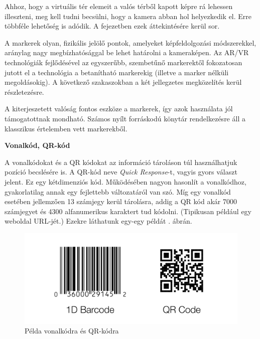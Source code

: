 
Ahhoz, hogy a virtuális tér elemeit a valós térből kapott képre rá lehessen illeszteni, meg kell tudni becsülni, hogy a kamera abban hol helyezkedik el.
Erre többféle lehetőség is adódik.
A fejezetben ezek áttekintésére kerül sor.


A markerek olyan, fizikális jelölő pontok, amelyeket képfeldolgozási módszerekkel, a\-rány\-lag nagy megbízhatósággal be lehet határolni a kameraképen.
Az AR/VR technológiák fejlődésével az egyszerűbb, szembetűnő markerektől fokozatosan jutott el a technológia a betanítható markerekig (illetve a marker nélküli megoldásokig).
A következő szakaszokban a két jellegzetes megközelítés kerül részletezésre.


A kiterjeszetett valóság fontos eszköze a markerek, így azok használata jól támogatottnak mondható. Számos nyílt forráskodú könytár rendelkezésre áll a klasszikus értelemben vett markerekből.

\bigskip

\noindent \textbf{Vonalkód, QR-kód}

\medskip

A vonalkódokat és a QR kódokat az információ tároláson túl használhatjuk pozíció becslésére is.
A QR-kód neve \textit{Quick Response}-t, vagyis gyors választ jelent.
Ez egy kétdimenziós kód. Működésében nagyon hasonlít a vonalkódhoz, gyakorlatilag annak egy fejlettebb változatáról van szó.
Míg egy vonalkód esetében jellemzően 13 számjegy kerül tárolásra, addig a QR kód akár 7000 számjegyet és 4300 alfanumerikus karaktert tud kódolni. (Tipikusan például egy weboldal URL-jét.)
Ezekre láthatunk egy-egy példát . ábrán.

\begin{figure}[htp]
    \centering
   	\includegraphics[scale=0.25]{images/qr_bar.png}
	\caption{Példa vonalkódra és QR-kódra}
	\label{fig:barcode}
\end{figure}

